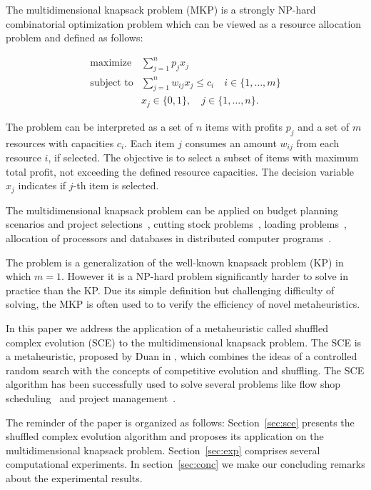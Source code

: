 
The multidimensional knapsack problem (MKP) is a strongly NP-hard combinatorial
optimization problem which can be viewed as a resource allocation problem and
defined as follows:

\begin{align*}
  \text{maximize} & \sum_{j=1}^n p_j x_j \\
  \text{subject to} & \sum_{j=1}^n w_{ij} x_j \leqslant c_i \quad i \in \{1, \ldots, m\}\\
   & x_j \in \{0, 1\}, \quad j \in \{1, \ldots, n\}.
\end{align*}

The problem can be interpreted as a set of $n$ items with profits $p_j$
and a set of $m$ resources with capacities $c_i$.
Each item $j$ consumes an amount $w_{ij}$ from each resource $i$, if selected.
The objective is to select a subset of items with maximum total profit,
not exceeding the defined resource capacities.
The decision variable $x_j$ indicates if $j$-th item is selected.

The multidimensional knapsack problem can be applied on budget planning 
scenarios and project selections~\cite{mcmillan1973resource},
cutting stock problems~\cite{Gilmore-Gomory-1966}, loading problems~\cite{Shih-1979},
allocation of processors and databases in distributed computer programs~\cite{Gavish-Pirckul-1982}.

The problem is a generalization of the well-known knapsack problem (KP) in which
$m = 1$.
However it is a NP-hard problem significantly harder to solve in practice than the KP.
Due its simple definition but challenging difficulty of solving, the MKP is often used to
to verify the efficiency of novel metaheuristics.

In this paper we address the application of a metaheuristic called
shuffled complex evolution (SCE) to the multidimensional knapsack problem.
The SCE is a metaheuristic, proposed by Duan in \cite{duan1992effective},
which combines the ideas of a controlled random search with the concepts
of competitive evolution and shuffling.
The SCE algorithm has been successfully used to solve several problems
like flow shop scheduling~\cite{zhao2014shuffled} and project management~\cite{elbeltagi2007modified}.

The reminder of the paper is organized as follows:
Section~\ref{sec:sce} presents the shuffled complex evolution algorithm
and proposes its application on the multidimensional knapsack problem.
Section~\ref{sec:exp} comprises several computational experiments.
In section~\ref{sec:conc} we make our concluding remarks about the experimental
results.


